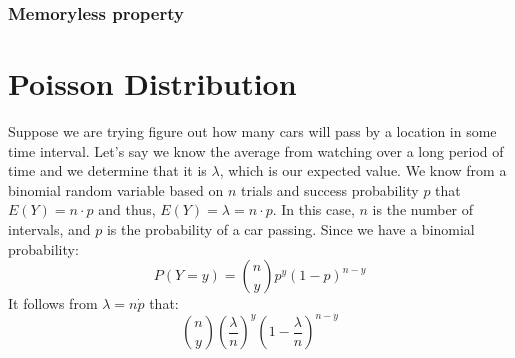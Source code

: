 \documentclass{article}
\theoremstyle{plain}
\theoremstyle{definition}
\theoremstyle{remark}
\begin{document}
\subsubsection{Memoryless property}


\section{Poisson Distribution}
Suppose we are trying figure out how many cars will pass by a location in some time interval. Let's say we know the average from watching over a long period of time and we determine that it is $\lambda$, which is our expected value. We know from a binomial random variable based on $n$ trials and success probability $p$ that $E(Y) = n \cdot p$ and thus, $E(Y) = \lambda = n \cdot p$. In this case, $n$ is the number of intervals, and $p$ is the probability of a car passing. Since we have a binomial probability:
$$
P(Y = y) = \displaystyle {n \choose y} p^y (1 - p)^{n-y}
$$
It follows from $\lambda = n \dot p$ that:
$$
{n \choose y}%
%
\left( 
  \frac{\lambda}{n} 
\right)^{y}%
%
\left(
  1 - \frac{\lambda}{n}
\right)^{n-y}
$$
\end{document}

